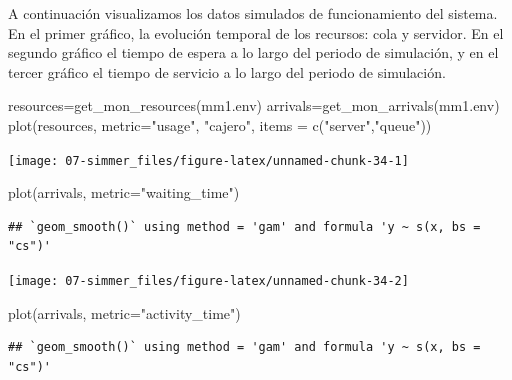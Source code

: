 \documentclass[
]{book}
\newenvironment{Shaded}{\begin{snugshade}}{\end{snugshade}}
\newcommand{\AttributeTok}[1]{\textcolor[rgb]{0.77,0.63,0.00}{#1}}
\newcommand{\FunctionTok}[1]{\textcolor[rgb]{0.00,0.00,0.00}{#1}}
\newcommand{\NormalTok}[1]{#1}
\newcommand{\OtherTok}[1]{\textcolor[rgb]{0.56,0.35,0.01}{#1}}
\newcommand{\StringTok}[1]{\textcolor[rgb]{0.31,0.60,0.02}{#1}}
\theoremstyle{definition}
\theoremstyle{definition}
\theoremstyle{definition}
\theoremstyle{definition}
\theoremstyle{remark}
\begin{document}
A continuación visualizamos los datos simulados de funcionamiento del sistema. En el primer gráfico, la evolución temporal de los recursos: cola y servidor. En el segundo gráfico el tiempo de espera a lo largo del periodo de simulación, y en el tercer gráfico el tiempo de servicio a lo largo del periodo de simulación.

\begin{Shaded}
\begin{Highlighting}[]
\NormalTok{resources}\OtherTok{=}\FunctionTok{get\_mon\_resources}\NormalTok{(mm1.env)}
\NormalTok{arrivals}\OtherTok{=}\FunctionTok{get\_mon\_arrivals}\NormalTok{(mm1.env)}
\FunctionTok{plot}\NormalTok{(resources, }\AttributeTok{metric=}\StringTok{"usage"}\NormalTok{, }\StringTok{"cajero"}\NormalTok{, }\AttributeTok{items =} \FunctionTok{c}\NormalTok{(}\StringTok{"server"}\NormalTok{,}\StringTok{"queue"}\NormalTok{))}
\end{Highlighting}
\end{Shaded}

\begin{center}\texttt{[image: 07-simmer\_files/figure-latex/unnamed-chunk-34-1]} \end{center}

\begin{Shaded}
\begin{Highlighting}[]
\FunctionTok{plot}\NormalTok{(arrivals, }\AttributeTok{metric=}\StringTok{"waiting\_time"}\NormalTok{)}
\end{Highlighting}
\end{Shaded}

\begin{verbatim}
## `geom_smooth()` using method = 'gam' and formula 'y ~ s(x, bs = "cs")'
\end{verbatim}

\begin{center}\texttt{[image: 07-simmer\_files/figure-latex/unnamed-chunk-34-2]} \end{center}

\begin{Shaded}
\begin{Highlighting}[]
\FunctionTok{plot}\NormalTok{(arrivals, }\AttributeTok{metric=}\StringTok{"activity\_time"}\NormalTok{)}
\end{Highlighting}
\end{Shaded}

\begin{verbatim}
## `geom_smooth()` using method = 'gam' and formula 'y ~ s(x, bs = "cs")'
\end{verbatim}
\end{document}
